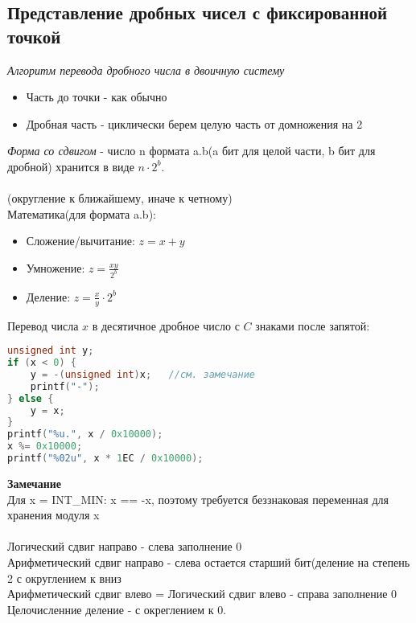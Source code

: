 \documentclass[12pt]{article}
\begin{document}
\subsection{Представление дробных чисел с фиксированной точкой}
\textit{Алгоритм перевода дробного числа в двоичную систему}\\
\begin{itemize}
    \item Часть до точки - как обычно
    \item Дробная часть - циклически берем целую часть от домножения на 2
\end{itemize}
\textit{Форма со сдвигом} - число n формата a.b(a бит для целой части, b бит для дробной) хранится в виде $n\cdot 2^b$.\\\\
(округление к ближайшему, иначе к четному)\\
Математика(для формата a.b):\\
\begin{itemize}
    \item Сложение/вычитание: $z=x+y$
    \item Умножение: $z=\frac{xy}{2^b}$
    \item Деление: $z=\frac{x}{y}\cdot 2^b$
\end{itemize}
Перевод числа $x$ в десятичное дробное число с $C$ знаками после запятой:
\begin{lstlisting}[language=C]
unsigned int y;
if (x < 0) {
    y = -(unsigned int)x;   //см. замечание
    printf("-");
} else {
    y = x;
}
printf("%u.", x / 0x10000);
x %= 0x10000;
printf("%02u", x * 1EC / 0x10000);
\end{lstlisting}
\textbf{Замечание}\\
Для x = INT\_MIN: x == -x, поэтому требуется беззнаковая переменная для хранения модуля x\\\\
Логический сдвиг направо - слева заполнение 0\\
Арифметический сдвиг направо - слева остается старший бит(деление на степень 2 с округлением к вниз\\
Арифметический сдвиг влево = Логический сдвиг влево - справа заполнение 0\\
Целочисленние деление - с окреглением к 0.
\end{document}
